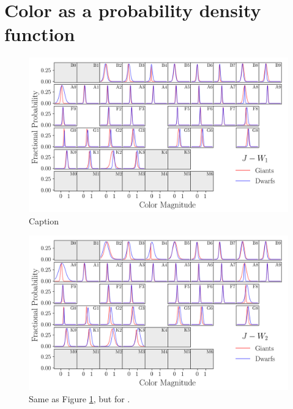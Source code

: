 \section{Color as a probability density function}
\label{subsec:quant_color}

\begin{figure}
    \centering
    \includegraphics[width=1.0\textwidth,clip=true]{Figures/periodic/periodic-t-pdf_J_W1.png}
    \caption{Caption}
    \label{fig:periodic-pdf-jw1}
\end{figure}

\begin{figure}
    \centering
    \includegraphics[width=1.0\textwidth,clip=true]{Figures/periodic/periodic-t-pdf_J_W2.png}
    \caption{Same as Figure \ref{fig:periodic-pdf-jw1}, but for \jwtwo.}
    \label{fig:periodic-pdf-jw2}
\end{figure}


